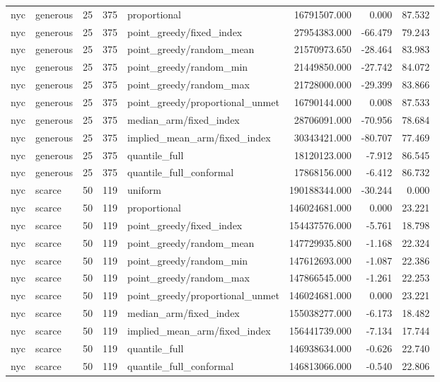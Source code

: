 \begin{tabular}{llrrlrrr}
nyc & generous & 25 & 375 & proportional & 16791507.000 & 0.000 & 87.532 \\
nyc & generous & 25 & 375 & point\_greedy/fixed\_index & 27954383.000 & -66.479 & 79.243 \\
nyc & generous & 25 & 375 & point\_greedy/random\_mean & 21570973.650 & -28.464 & 83.983 \\
nyc & generous & 25 & 375 & point\_greedy/random\_min & 21449850.000 & -27.742 & 84.072 \\
nyc & generous & 25 & 375 & point\_greedy/random\_max & 21728000.000 & -29.399 & 83.866 \\
nyc & generous & 25 & 375 & point\_greedy/proportional\_unmet & 16790144.000 & 0.008 & 87.533 \\
nyc & generous & 25 & 375 & median\_arm/fixed\_index & 28706091.000 & -70.956 & 78.684 \\
nyc & generous & 25 & 375 & implied\_mean\_arm/fixed\_index & 30343421.000 & -80.707 & 77.469 \\
nyc & generous & 25 & 375 & quantile\_full & 18120123.000 & -7.912 & 86.545 \\
nyc & generous & 25 & 375 & quantile\_full\_conformal & 17868156.000 & -6.412 & 86.732 \\
nyc & scarce & 50 & 119 & uniform & 190188344.000 & -30.244 & 0.000 \\
nyc & scarce & 50 & 119 & proportional & 146024681.000 & 0.000 & 23.221 \\
nyc & scarce & 50 & 119 & point\_greedy/fixed\_index & 154437576.000 & -5.761 & 18.798 \\
nyc & scarce & 50 & 119 & point\_greedy/random\_mean & 147729935.800 & -1.168 & 22.324 \\
nyc & scarce & 50 & 119 & point\_greedy/random\_min & 147612693.000 & -1.087 & 22.386 \\
nyc & scarce & 50 & 119 & point\_greedy/random\_max & 147866545.000 & -1.261 & 22.253 \\
nyc & scarce & 50 & 119 & point\_greedy/proportional\_unmet & 146024681.000 & 0.000 & 23.221 \\
nyc & scarce & 50 & 119 & median\_arm/fixed\_index & 155038277.000 & -6.173 & 18.482 \\
nyc & scarce & 50 & 119 & implied\_mean\_arm/fixed\_index & 156441739.000 & -7.134 & 17.744 \\
nyc & scarce & 50 & 119 & quantile\_full & 146938634.000 & -0.626 & 22.740 \\
nyc & scarce & 50 & 119 & quantile\_full\_conformal & 146813066.000 & -0.540 & 22.806 \\

\end{tabular}
